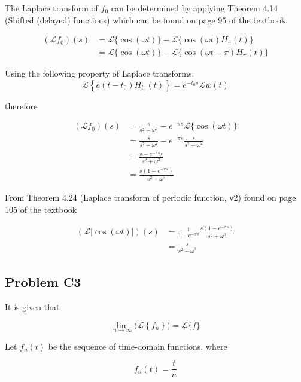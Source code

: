 \documentclass[a4paper,10pt,reqno]{amsart}
\numberwithin{equation}{section}
\newcommand{\lap}{\mathscr{L}}
\begin{document}
The Laplace transform of $f_0$ can be determined by applying Theorem 4.14 (Shifted (delayed) functions) which can be found on page 95 of the textbook.

\begin{align}
(\lap f_0)(s) &= \lap\{\cos(\omega t)\} - \lap\{\cos(\omega t)H_\pi(t)\} \\
&= \lap\{\cos(\omega t)\} - \lap\{\cos(\omega t - \pi)H_\pi(t)\}
\end{align}

Using the following property of Laplace transforms:
\begin{equation}
    \lap\left\{e(t - t_0)H_{t_0}(t)\right\} = e^{-t_0 s}\lap{w(t)}
\end{equation}

therefore

\begin{align}
     (\lap f_0)(s) &= \frac{s}{s^2 + \omega^2} - e^{-\pi s}\lap\{\cos(\omega t)\} \\
     &= \frac{s}{s^2 + \omega^2} - e^{-\pi s}\frac{s}{s^2 + \omega^2} \\
     &= \frac{s - e^{-\pi s}s}{s^2 + \omega^2} \\
     &= \frac{s(1 - e^{-\pi s})}{s^2 + \omega^2}
\end{align}

From Theorem 4.24 (Laplace transform of periodic function, v2) found on page 105 of the textbook

\begin{align}
(\lap|{\cos(\omega t)|})(s) &= \frac{1}{1 - e^{-\pi s}}\frac{s(1 - e^{-\pi s})}{s^2 + \omega^2} \\
&= \frac{s}{s^2 + \omega^2}
\end{align}


\subsection{Problem C3}\label{sec:c3}

It is given that

\begin{equation}\label{eq:pntwise_lap}
    \lim_{n \to \infty} \big(\lap\left\{f_n\right\}\big) = \lap\{f\}
\end{equation}
\vspace{1pt}

Let $f_n(t)$ be the sequence of time-domain functions, where

\begin{equation}
     f_n(t) = \frac{t}{n}
\end{equation}
\vspace{1pt}
\end{document}
